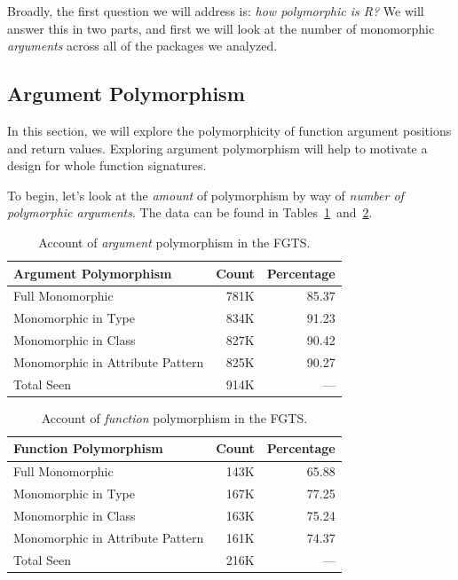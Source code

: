 \documentclass[acmsmall,10pt,review,anonymous]{acmart}\settopmatter{printfolios=true,printccs=false,printacmref=false}
\begin{document}
Broadly, the first question we will address is: {\it how polymorphic is R?} 
We will answer this in two parts, and first we will look at the number of monomorphic {\it arguments} across all of the packages we analyzed.  

%
%
%
%
\subsection{Argument Polymorphism}

In this section, we will explore the polymorphicity of function argument positions and return values.
Exploring argument polymorphism will help to motivate a design for whole function signatures.

To begin, let's look at the {\it amount} of polymorphism by way of {\it number of polymorphic arguments}.
The data can be found in Tables~\ref{tab:argcountsFGTS}~and~\ref{tab:funcountsFGTS}.

\begin{table}[ht]
\label{tab:argcountsFGTS}
\centering
\begin{tabular}{lrr}
  \hline
 Argument Polymorphism & Count & Percentage \\ 
  \hline
  Full Monomorphic & 781K & 85.37 \\ 
  Monomorphic in Type & 834K & 91.23 \\ 
  Monomorphic in Class & 827K & 90.42 \\ 
  Monomorphic in Attribute Pattern & 825K & 90.27 \\ 
  Total Seen & 914K & --- \\ 
     \hline
\end{tabular}
\caption{Account of {\it argument} polymorphism in the FGTS.}
\end{table}

\begin{table}[ht]
\label{tab:funcountsFGTS}
\centering
\begin{tabular}{lrr}
  \hline
 Function Polymorphism & Count & Percentage \\ 
  \hline
  Full Monomorphic & 143K & 65.88 \\ 
  Monomorphic in Type & 167K & 77.25 \\ 
  Monomorphic in Class & 163K & 75.24 \\ 
  Monomorphic in Attribute Pattern & 161K & 74.37 \\ 
  Total Seen & 216K & --- \\ 
   \hline
\end{tabular}
\caption{Account of {\it function} polymorphism in the FGTS.}
\end{table}
\end{document}

